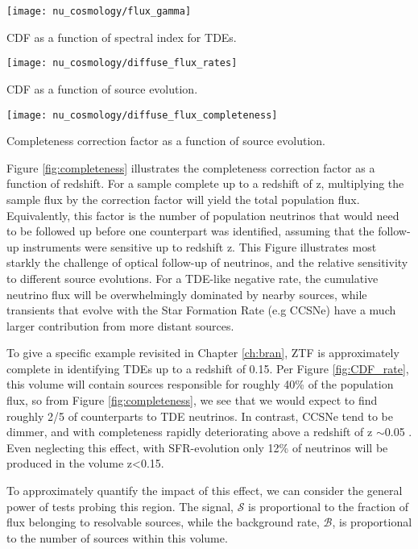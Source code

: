 \begin{marginfigure}
	\centering \texttt{[image: nu\_cosmology/flux\_gamma]}
	\caption{CDF as a function of spectral index for TDEs.}
	\label{fig:CDF_gamma}
\end{marginfigure}


\begin{marginfigure}
	\centering \texttt{[image: nu\_cosmology/diffuse\_flux\_rates]}
	\caption{CDF as a function of source evolution.}
	\label{fig:CDF_rate}
\end{marginfigure}

\begin{marginfigure}
	\centering \texttt{[image: nu\_cosmology/diffuse\_flux\_completeness]}
	\caption{Completeness correction factor as a function of source evolution.}
	\label{fig:completeness}
\end{marginfigure}

Figure \ref{fig:completeness} illustrates the completeness correction factor as a function of redshift. For a sample complete up to a redshift of z, multiplying the sample flux by the correction factor will yield the total population flux. Equivalently,  this factor is the number of population neutrinos that would need to be followed up before one counterpart was identified, assuming that the follow-up instruments were sensitive up to redshift z. This Figure illustrates most starkly the challenge of optical follow-up of neutrinos, and the relative sensitivity to different source evolutions. For a TDE-like negative rate, the cumulative neutrino flux  will be overwhelmingly dominated by nearby sources, while transients that evolve with the Star Formation Rate (e.g CCSNe) have a much larger contribution from more distant sources.

To give a specific example revisited in Chapter \ref{ch:bran}, ZTF is approximately complete in identifying TDEs up to a redshift of 0.15. Per Figure \ref{fig:CDF_rate}, this volume will contain sources responsible for roughly 40\% of the population flux, so from Figure \ref{fig:completeness}, we see that we would expect to find roughly 2/5 of counterparts to TDE neutrinos. In contrast, CCSNe tend to be dimmer, and with completeness rapidly deteriorating above a redshift of z $\sim$0.05 . Even neglecting this effect, with SFR-evolution only 12\% of neutrinos will be produced in the volume z<0.15.

To approximately quantify the impact of this effect, we can consider the general power of tests probing this region. The signal, $\mathcal{S}$ is proportional to the fraction of flux belonging to resolvable sources, while the background rate, $\mathcal{B}$, is proportional to the number of sources within this volume.


